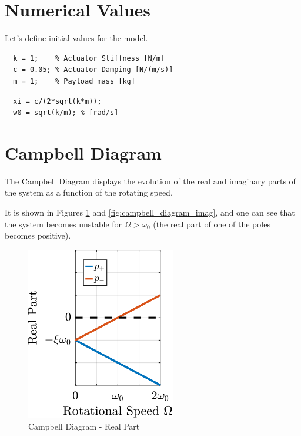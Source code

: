 \documentclass[a4paper, 10pt, DIV=12, parskip=full]{scrreprt}
\begin{document}
\section{Numerical Values}
\label{sec:orgafc7947}
Let's define initial values for the model.
\begin{verbatim}
  k = 1;    % Actuator Stiffness [N/m]
  c = 0.05; % Actuator Damping [N/(m/s)]
  m = 1;    % Payload mass [kg]
\end{verbatim}

\begin{verbatim}
  xi = c/(2*sqrt(k*m));
  w0 = sqrt(k/m); % [rad/s]
\end{verbatim}

\section{Campbell Diagram}
\label{sec:org008e1a4}
The Campbell Diagram displays the evolution of the real and imaginary parts of the system as a function of the rotating speed.

It is shown in Figures \ref{fig:campbell_diagram_real} and \ref{fig:campbell_diagram_imag}, and one can see that the system becomes unstable for \(\Omega > \omega_0\) (the real part of one of the poles becomes positive).

\begin{figure}[htbp]
\centering
\includegraphics[scale=1]{figs/campbell_diagram_real.png}
\caption{\label{fig:campbell_diagram_real}Campbell Diagram - Real Part}
\end{figure}
\end{document}
